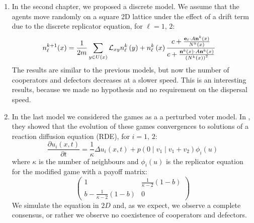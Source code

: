 \begin{enumerate}
\item In the second chapter, we proposed a discrete model. We assume that
the agents move randomly on a square 2D lattice under the effect of
a drift term due to the discrete replicator equation, for $\ell=1,\,2$:
\begin{align*}
n_{\ell}^{k+1}(x) & =\frac{1}{2m}\sum_{y\in U(x)}\mathcal{L}_{xy}n_{\ell}^{k}\left(y\right)+n_{\ell}^{k}\left(x\right)\frac{c+\frac{{\bf e}_{\ell}\cdot A{\bf n}^{k}\left(x\right)}{N^{k}\left(x\right)}}{c+\frac{{\bf n}^{k}\left(x\right)\cdot A{\bf n}^{k}\left(x\right)}{\left(N^{k}\left(x\right)\right)^{2}}}
\end{align*}
The results are similar to the previous models, but now the number
of cooperators and defectors decreases at a slower speed. This is
an interesting results, because we made no hypothesis and no requirement
on the dispersal speed. 
\item In the last model we considered the games as a a perturbed voter model.
In \cite{durrett_spatial_2014,cox_voter_2011}, they showed that the
evolution of these games convergences to solutions of a reaction diffusion
equation (RDE), for $i=1,\,2$:
\[
\frac{\partial u_{i}\left(x,t\right)}{\partial t}=\frac{1}{\kappa}\Delta u_{i}\left(x,t\right)+p\left(0\mid v_{1}\mid v_{1}+v_{2}\right)\phi_{i}\left(u\right)
\]
where $\kappa$ is the number of neighbours and $\phi_{i}\left(u\right)$
is the replicator equation for the modified game with a payoff matrix:
\[
\left(\begin{array}{cc}
1 & \frac{1}{\kappa-2}\left(1-b\right)\\
b-\frac{1}{\kappa-2}\left(1-b\right) & 0
\end{array}\right)
\]
We simulate the equation in $2D$ and, as we expect, we observe a
complete consensus, or rather we observe no coexistence of cooperators
and defectors.
\end{enumerate}

